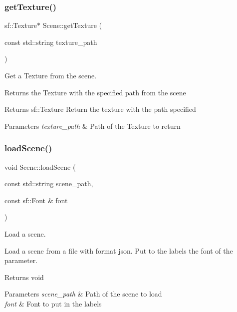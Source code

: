 \subsubsection{\texorpdfstring{get\+Texture()}{getTexture()}}
{\footnotesize\ttfamily sf\+::\+Texture$\ast$ Scene\+::get\+Texture (\begin{DoxyParamCaption}\item[{const std\+::string}]{texture\+\_\+path }\end{DoxyParamCaption})}



Get a Texture from the scene. 

Returns the Texture with the specified path from the scene

\begin{DoxyReturn}{Returns}
sf\+::\+Texture Return the texture with the path specified 
\end{DoxyReturn}

\begin{DoxyParams}{Parameters}
{\em texture\+\_\+path} & Path of the Texture to return \\
\hline
\end{DoxyParams}
\mbox{\label{class_scene_aca9bd4059c420909135294125b591682}} 
\subsubsection{\texorpdfstring{load\+Scene()}{loadScene()}}
{\footnotesize\ttfamily void Scene\+::load\+Scene (\begin{DoxyParamCaption}\item[{const std\+::string}]{scene\+\_\+path,  }\item[{const sf\+::\+Font \&}]{font }\end{DoxyParamCaption})}



Load a scene. 

Load a scene from a file with format json. Put to the labels the font of the parameter.

\begin{DoxyReturn}{Returns}
void 
\end{DoxyReturn}

\begin{DoxyParams}{Parameters}
{\em scene\+\_\+path} & Path of the scene to load \\
\hline
{\em font} & Font to put in the labels \\
\hline
\end{DoxyParams}
\mbox{\label{class_scene_ade7d7ad9e17a99a035f0a8ecb5495cd4}} 
